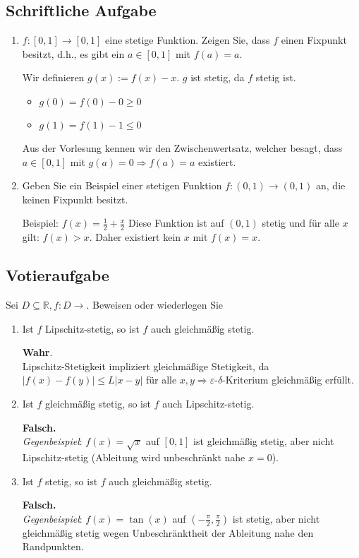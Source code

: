 \documentclass[a4paper]{article}
\begin{document}
\subsection{Schriftliche Aufgabe}
\begin{enumerate}
    \item $f: [0, 1] \rightarrow [0, 1]$ eine stetige Funktion. Zeigen Sie, dass $f$ einen Fixpunkt besitzt, d.h., es gibt ein $a \in [0, 1]$ mit $f(a) = a$.

    Wir definieren $g(x) := f(x) - x$. $g$ ist stetig, da $f$ stetig ist.
    \begin{itemize}
        \item $g(0) = f(0) - 0 \geq 0$
        \item $g(1) = f(1) - 1 \leq 0$
    \end{itemize}
    Aus der Vorlesung kennen wir den Zwischenwertsatz, welcher besagt, dass $a \in [0,1]$ mit $g(a) = 0 \Rightarrow f(a) = a$ existiert.

    \item Geben Sie ein Beispiel einer stetigen Funktion $f: (0, 1) \rightarrow (0,1 )$ an, die keinen Fixpunkt besitzt.

    Beispiel: $f(x) = \frac{1}{2} + \frac{x}{2}$  
    Diese Funktion ist auf $(0,1)$ stetig und für alle $x$ gilt: $f(x) > x$.  
    Daher existiert kein $x$ mit $f(x) = x$.
\end{enumerate}

\subsection{Votieraufgabe}
Sei $D \subseteq \mathbb{R}, f: D \rightarrow$. Beweisen oder wiederlegen Sie
\begin{enumerate}[label=(\alph*)]
\item Ist $f$ Lipschitz-stetig, so ist $f$ auch gleichmäßig stetig.

\textbf{Wahr}.\\  
Lipschitz-Stetigkeit impliziert gleichmäßige Stetigkeit, da $|f(x) - f(y)| \leq L |x - y|$ für alle $x,y \Rightarrow \varepsilon$-$\delta$-Kriterium gleichmäßig erfüllt.

\item Ist $f$ gleichmäßig stetig, so ist $f$ auch Lipschitz-stetig.
 
\textbf{Falsch.}\\  
\textit{Gegenbeispiel}: $f(x) = \sqrt{x}$ auf $[0,1]$ ist gleichmäßig stetig, aber nicht Lipschitz-stetig (Ableitung wird unbeschränkt nahe $x = 0$).

\item Ist $f$ stetig, so ist $f$ auch gleichmäßig stetig.

\textbf{Falsch.}\\
\textit{Gegenbeispiel}: $f(x) = \tan(x)$ auf $(-\frac{\pi}{2}, \frac{\pi}{2})$ ist stetig, aber nicht gleichmäßig stetig wegen Unbeschränktheit der Ableitung nahe den Randpunkten.
\end{enumerate}
\end{document}
